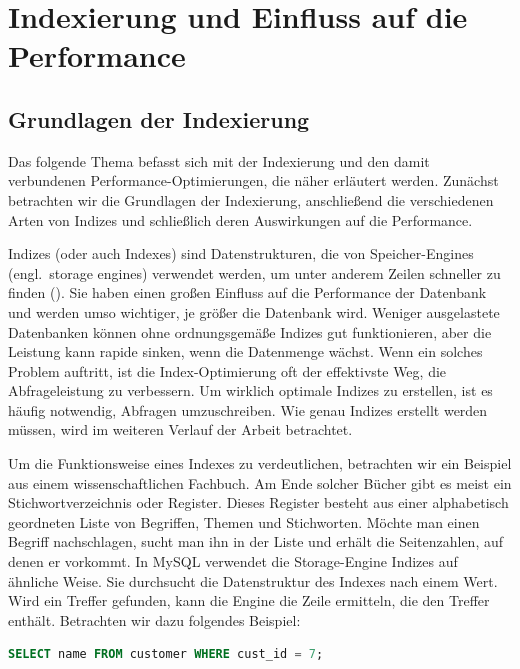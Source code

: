 
\chapter{Indexierung und Einfluss auf die Performance}\label{ch:indexing}

\section{Grundlagen der Indexierung}\label{sec:indexing-grundlagen-der-indexierung}

Das folgende Thema befasst sich mit der Indexierung und den damit verbundenen Performance-Optimierungen, die näher erläutert werden.
Zunächst betrachten wir die Grundlagen der Indexierung, anschließend die verschiedenen Arten von Indizes und schließlich deren Auswirkungen auf die Performance.

Indizes (oder auch Indexes) sind Datenstrukturen, die von Speicher-Engines (engl.\ storage engines) verwendet werden, um unter anderem Zeilen schneller zu finden (\cite[pp. 147--189]{schwartz2012high}).
Sie haben einen großen Einfluss auf die Performance der Datenbank und werden umso wichtiger, je größer die Datenbank wird.
Weniger ausgelastete Datenbanken können ohne ordnungsgemäße Indizes gut funktionieren, aber die Leistung kann rapide sinken, wenn die Datenmenge wächst.
Wenn ein solches Problem auftritt, ist die Index-Optimierung oft der effektivste Weg, die Abfrageleistung zu verbessern.
Um wirklich optimale Indizes zu erstellen, ist es häufig notwendig, Abfragen umzuschreiben.
Wie genau Indizes erstellt werden müssen, wird im weiteren Verlauf der Arbeit betrachtet.

Um die Funktionsweise eines Indexes zu verdeutlichen, betrachten wir ein Beispiel aus einem wissenschaftlichen Fachbuch.
Am Ende solcher Bücher gibt es meist ein Stichwortverzeichnis oder Register.
Dieses Register besteht aus einer alphabetisch geordneten Liste von Begriffen, Themen und Stichworten.
Möchte man einen Begriff nachschlagen, sucht man ihn in der Liste und erhält die Seitenzahlen, auf denen er vorkommt.
In MySQL verwendet die Storage-Engine Indizes auf ähnliche Weise.
Sie durchsucht die Datenstruktur des Indexes nach einem Wert.
Wird ein Treffer gefunden, kann die Engine die Zeile ermitteln, die den Treffer enthält.
Betrachten wir dazu folgendes Beispiel:

\begin{lstlisting}[language=SQL,caption=Variationen,label={lst:select-query-customer}]
SELECT name FROM customer WHERE cust_id = 7;
\end{lstlisting}

